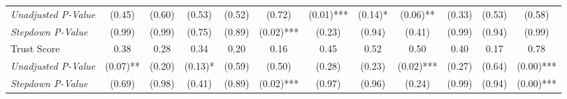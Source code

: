 \begin{tabular}{l c c c c c c c c c c c}
\quad \textit{Unadjusted P-Value} & (0.45) & (0.60) & (0.53) & (0.52) & (0.72) & (0.01)*** & (0.14)* & (0.06)** & (0.33) & (0.53) & (0.58) \\
\quad \textit{Stepdown P-Value} & (0.99) & (0.99) & (0.75) & (0.89) & (0.02)*** & (0.23) & (0.94) & (0.41) & (0.99) & (0.94) & (0.99) \\
Trust Score & 0.38 & 0.28 & 0.34 & 0.20 & 0.16 & 0.45 & 0.52 & 0.50 & 0.40 & 0.17 & 0.78 \\
\quad \textit{Unadjusted P-Value} & (0.07)** & (0.20) & (0.13)* & (0.59) & (0.50) & (0.28) & (0.23) & (0.02)*** & (0.27) & (0.64) & (0.00)*** \\
\quad \textit{Stepdown P-Value} & (0.69) & (0.98) & (0.41) & (0.89) & (0.02)*** & (0.97) & (0.96) & (0.24) & (0.99) & (0.94) & (0.00)*** \\
\bottomrule
\end{tabular}
